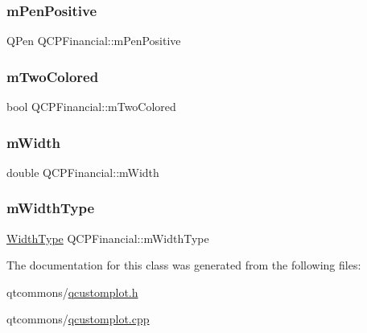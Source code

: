 \subsubsection{\texorpdfstring{mPenPositive}{mPenPositive}}
{\footnotesize\ttfamily Q\+Pen Q\+C\+P\+Financial\+::m\+Pen\+Positive\hspace{0.3cm}{\ttfamily [protected]}}

\mbox{\label{class_q_c_p_financial_a6afe919190b884d9bac026cefcc8c0a8}} 
\subsubsection{\texorpdfstring{mTwoColored}{mTwoColored}}
{\footnotesize\ttfamily bool Q\+C\+P\+Financial\+::m\+Two\+Colored\hspace{0.3cm}{\ttfamily [protected]}}

\mbox{\label{class_q_c_p_financial_af630e5eb8485146b9c777e63fd1cf993}} 
\subsubsection{\texorpdfstring{mWidth}{mWidth}}
{\footnotesize\ttfamily double Q\+C\+P\+Financial\+::m\+Width\hspace{0.3cm}{\ttfamily [protected]}}

\mbox{\label{class_q_c_p_financial_a7926204997e04c9de9dbe1f092df125a}} 
\subsubsection{\texorpdfstring{mWidthType}{mWidthType}}
{\footnotesize\ttfamily \mbox{\hyperlink{class_q_c_p_financial_aef1761dda71a53dc5269685e9e492626}{Width\+Type}} Q\+C\+P\+Financial\+::m\+Width\+Type\hspace{0.3cm}{\ttfamily [protected]}}



The documentation for this class was generated from the following files\+:\begin{DoxyCompactItemize}
\item 
qtcommons/\mbox{\hyperlink{qcustomplot_8h}{qcustomplot.\+h}}\item 
qtcommons/\mbox{\hyperlink{qcustomplot_8cpp}{qcustomplot.\+cpp}}\end{DoxyCompactItemize}
